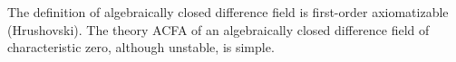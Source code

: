 The definition of algebraically closed difference field is first-order axiomatizable (Hrushovski). The theory ACFA of an algebraically closed difference field of characteristic zero, although unstable, is simple.
